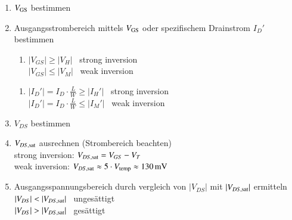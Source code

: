 {
\begin{enumerate}
    \item $V_{\rm GS}$ bestimmen 
    \item Ausgangsstrombereich mittels $V_{\rm GS}$ oder spezifischem Drainstrom $I_D'$ bestimmen 
    
    \begin{minipage}[t]{0.45\columnwidth}
        \begin{enumerate}[label=\bfseries\alph*)]
            \item $|V_{GS}| \geq |V_H|$ \rightarrow\ strong inversion \\
                $|V_{GS}| \leq |V_M|$ \rightarrow\ weak inversion
        \end{enumerate}
    \end{minipage}
    \hfill
    \begin{minipage}[t]{0.52\columnwidth}
        \begin{enumerate}[start=2, label=\bfseries\alph*)]
            \item $|I_D'| = I_D \cdot \frac{L}{W} \geq |I_H'|$ \rightarrow\ strong inversion \\
                $|I_D'| = I_D \cdot \frac{L}{W} \leq |I_M'|$ \rightarrow\ weak inversion 
        \end{enumerate}
    \end{minipage}

    \item $V_{DS}$ bestimmen
    \item $V_{DS, \rm sat}$ ausrechnen (Strombereich beachten)  \\
        strong inversion: $V_{DS, \rm sat} = V_{GS} - V_T$  \\
        weak inversion: $V_{DS, \rm sat} \approx 5 \cdot V_{\rm temp} \approx \qty{130}{\milli \volt}$ 
    \item Ausgangsspannungsbereich durch vergleich von $|V_{DS}|$ mit $|V_{DS, \rm sat}|$ ermitteln  \\
        $|V_{DS}| < |V_{DS, \rm sat}|$ \rightarrow\ ungesättigt \\
        $|V_{DS}| > |V_{DS, \rm sat}|$ \rightarrow\ gesättigt
\end{enumerate}
}


